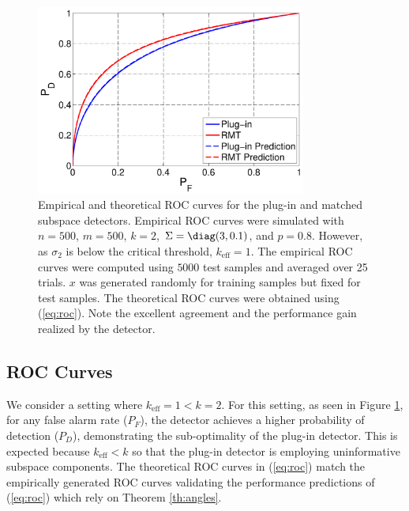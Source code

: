 \begin{figure}[t]
\centering
\includegraphics[width=3.5in]{figures/basic_roc.pdf}
\caption{Empirical and theoretical ROC curves for the plug-in and \DIFdelbeginFL {}\DIFdelendFL \DIFaddbeginFL {}\DIFaddendFL matched subspace detectors. Empirical ROC curves were simulated with $n=500$, $m=500$, $k=2$, $\Sigma=\diag(3,0.1)$, and $p=0.8$. However, as $\sigma_2$ is below the critical threshold, $k_{\text{eff}} = 1$. The empirical ROC curves were computed using $5000$ test samples and averaged over 25 trials. $x$ was generated randomly for training samples but fixed for test samples. The theoretical ROC curves were obtained using (\ref{eq:roc}). Note the excellent agreement and the performance gain realized by the \DIFdelbeginFL {}\DIFdelendFL \DIFaddbeginFL {}\DIFaddendFL detector.}\vskip-0.45cm
\label{fig:roc1}
\end{figure}


\subsection{ROC Curves}

We consider a setting where $k_{\text{eff}} = 1 < k = 2$. For this setting, as seen in Figure \ref{fig:roc1}, for any false alarm rate ($P_F$), the \DIFdelbegin {}\DIFdelend \DIFaddbegin {}\DIFaddend detector achieves a higher probability of detection ($P_D$), demonstrating the sub-optimality of the plug-in detector. This is expected because $k_\text{eff}<k$ so that the plug-in detector is employing uninformative subspace components. The theoretical ROC curves in (\ref{eq:roc}) match the empirically generated ROC curves validating the performance predictions of (\ref{eq:roc}) which rely on Theorem \ref{th:angles}.

